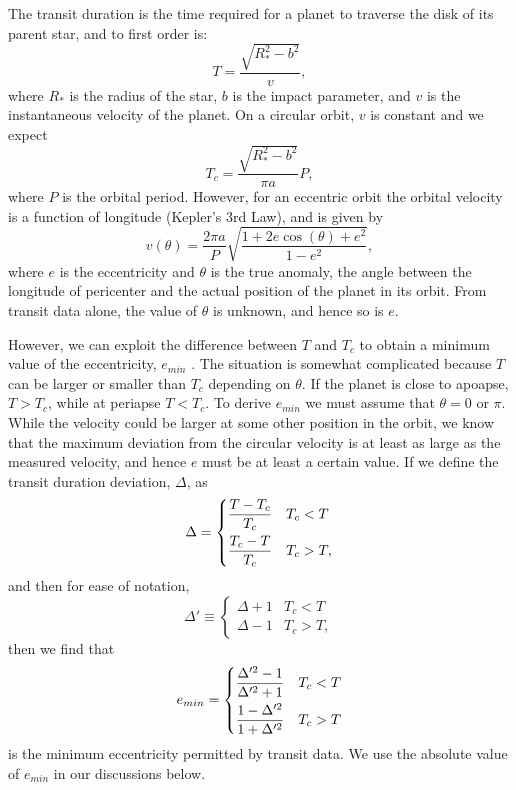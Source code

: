 The transit duration is the time required for a planet to traverse the
disk of its parent star, and to first order is:
\begin{equation}\label{eq:duration}
T = \frac{\sqrt{R_*^2 - b^2}}{v},
\end{equation}
where $R_*$ is the radius of the star, $b$ is the impact parameter,
and $v$ is the instantaneous velocity of the planet. On a circular
orbit, $v$ is constant and we expect
\begin{equation}\label{eq:durcirc}
T_c = \frac{\sqrt{R_*^2 - b^2}}{\pi a}P,
\end{equation}
where $P$ is the orbital period. However, for an eccentric orbit the
orbital velocity is a function of longitude (Kepler's 3rd Law), and is
given by
\begin{equation}\label{eq:velocity}
v(\theta) = \frac{2\pi a}{P}\sqrt{\frac{1 + 2e\cos(\theta) + e^2}{1-e^2}},
\end{equation}
where $e$ is the eccentricity and $\theta$ is the true anomaly, the
angle between the longitude of pericenter and the actual position of
the planet in its orbit. From transit data alone, the value of
$\theta$ is unknown, and hence so is $e$.

However, we can exploit the difference between $T$ and $T_c$ to obtain
a minimum value of the eccentricity, $e_{min}$ \citep{Barnes07}. The
situation is somewhat complicated because $T$ can be larger or smaller
than $T_c$ depending on $\theta$. If the planet is close to apoapse,
$T > T_c$, while at periapse $T < T_c$. To derive $e_{min}$ we must
assume that $\theta = 0$ or $\pi$. While the velocity could be larger
at some other position in the orbit, we know that the maximum
deviation from the circular velocity is at least as large as the
measured velocity, and hence $e$ must be at least a certain value. If
we define the transit duration deviation, $\Delta$, as
\begin{equation}\label{eq:tdd}
\Delta = \begin{dcases} \frac{T-T_c}{T_c} & T_c < T \\ \frac{T_c - T}{T_c} & T_c > T, \end{dcases}
\end{equation}
and then for ease of notation,
\begin{equation}\label{eq:deltaprime}
\Delta' \equiv \begin{cases} \Delta + 1 & T_c < T \\ \Delta - 1 & T_c > T, \end{cases}
\end{equation}
then we find that
\begin{equation}\label{eq:emin}
e_{min} = \begin{dcases} \frac{\Delta'^2 - 1}{\Delta'^2 + 1} & T_c < T \\ \frac{1 - \Delta'^2}{1 + \Delta'^2} & T_c > T \end{dcases}
\end{equation}
is the minimum eccentricity permitted by transit data.  We use the
absolute value of $e_{min}$ in our discussions below.

